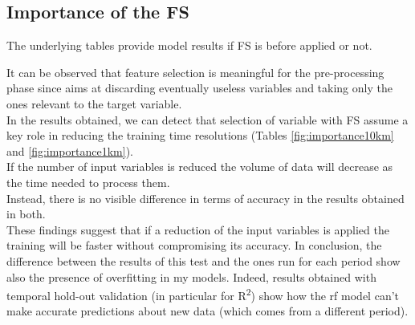 \subsection{Importance of the FS}
The underlying tables provide model results if FS is before applied or not.

It can be observed that feature selection is meaningful for the pre-processing phase since aims at discarding eventually useless variables and taking only the ones relevant to the target variable. \\
In the results obtained, we can detect that selection of variable with FS assume a key role in reducing the training time resolutions (Tables \ref{fig:importance10km} and \ref{fig:importance1km}).\\
If the number of input variables is reduced the volume of data will decrease as the time needed to process them.\\
Instead, there is no visible difference in terms of accuracy in the results obtained in both.\\
These findings suggest that if a reduction of the input variables is applied the training will be faster without compromising its accuracy.
In conclusion, the difference between the results of this test and the ones run for each period show also the presence of overfitting in my models. Indeed, results obtained with temporal hold-out validation (in particular for  R\textsuperscript{2}) show how the \acrshort{rf} model can't make accurate predictions about new data (which comes from a different period).  

